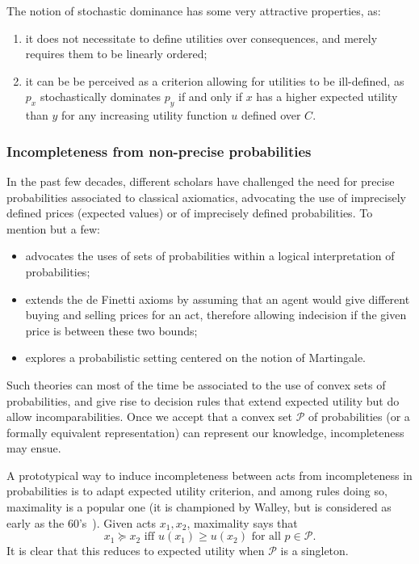 \documentclass[french, english]{llncs}
\begin{document}
The notion of stochastic dominance has some very attractive properties, as:
\begin{enumerate}
	\item it does not necessitate to define utilities over consequences, and merely requires them to be linearly ordered;
	\item it can be be perceived as a criterion allowing for utilities to be ill-defined, as $p_x$ stochastically dominates $p_y$ if and only if $x$ has a higher expected utility than $y$ for any increasing utility function $u$ defined over $C$. 
\end{enumerate}

\subsubsection{Incompleteness from non-precise probabilities}

In the past few decades, different scholars have challenged the need for precise probabilities associated to classical axiomatics, advocating the use of imprecisely defined prices (expected values) or of imprecisely defined probabilities. To mention but a few:
\begin{itemize} 
	\item \citet{levi_enterprise_1983} advocates the uses of sets of probabilities within a logical interpretation of probabilities;
	\item \citet{walley_statistical_1991} extends the de Finetti axioms by assuming that an agent would give different buying and selling prices for an act, therefore allowing indecision if the given price is between these two bounds;
	\item \citet{shafer_probability_2005} explores a probabilistic setting centered on the notion of Martingale.
\end{itemize}
Such theories can most of the time be associated to the use of convex sets of probabilities, and give rise to decision rules that extend expected utility but do allow incomparabilities. Once we accept that a convex set $\mathcal{P}$ of probabilities (or a formally equivalent representation) can represent our knowledge, incompleteness may ensue. 

A prototypical way to induce incompleteness between acts from incompleteness in probabilities is to adapt expected utility criterion, and among rules doing so, maximality is a popular one (it is championed by Walley, but is considered as early as the 60's~\citep{aumann_utility_1962}). Given acts $x_1, x_2$, maximality says that 
$$x_1 \succeq x_2 \text{ iff }  u(x_1) ≥ u(x_2) \text{ for all } p \in \mathcal{P}.$$
It is clear that this reduces to expected utility when $\mathcal{P}$ is a singleton. 
	
\end{document}
